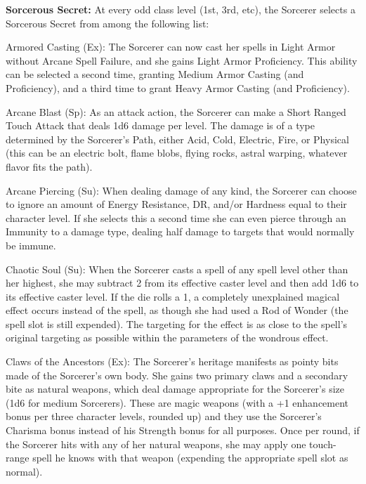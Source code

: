 \textbf{Sorcerous Secret:} At every odd class level (1st, 3rd, etc), the Sorcerer selects a Sorcerous Secret from among the following list:

\begin{description*}

\item[Armored Casting (Ex):] The Sorcerer can now cast her spells in Light Armor without Arcane Spell Failure, and she gains Light Armor Proficiency. This ability can be selected a second time, granting Medium Armor Casting (and Proficiency), and a third time to grant Heavy Armor Casting (and Proficiency).

\item[Arcane Blast (Sp):] As an attack action, the Sorcerer can make a Short Ranged Touch Attack that deals 1d6 damage per level. The damage is of a type determined by the Sorcerer's Path, either Acid, Cold, Electric, Fire, or Physical (this can be an electric bolt, flame blobs, flying rocks, astral warping, whatever flavor fits the path).

\item[Arcane Piercing (Su):] When dealing damage of any kind, the Sorcerer can choose to ignore an amount of Energy Resistance, DR, and/or Hardness equal to their character level. If she selects this a second time she can even pierce through an Immunity to a damage type, dealing half damage to targets that would normally be immune.

\item[Chaotic Soul (Su):] When the Sorcerer casts a spell of any spell level other than her highest, she may subtract 2 from its effective caster level and then add 1d6 to its effective caster level. If the die rolls a 1, a completely unexplained magical effect occurs instead of the spell, as though she had used a Rod of Wonder (the spell slot is still expended). The targeting for the effect is as close to the spell's original targeting as possible within the parameters of the wondrous effect.

\item[Claws of the Ancestors (Ex):] The Sorcerer's heritage manifests as pointy bits made of the Sorcerer's own body. She gains two primary claws and a secondary bite as natural weapons, which deal damage appropriate for the Sorcerer's size (1d6 for medium Sorcerers). These are magic weapons (with a +1 enhancement bonus per three character levels, rounded up) and they use the Sorcerer's Charisma bonus instead of his Strength bonus for all purposes. Once per round, if the Sorcerer hits with any of her natural weapons, she may apply one touch-range spell he knows with that weapon (expending the appropriate spell slot as normal).


\end{description*}
